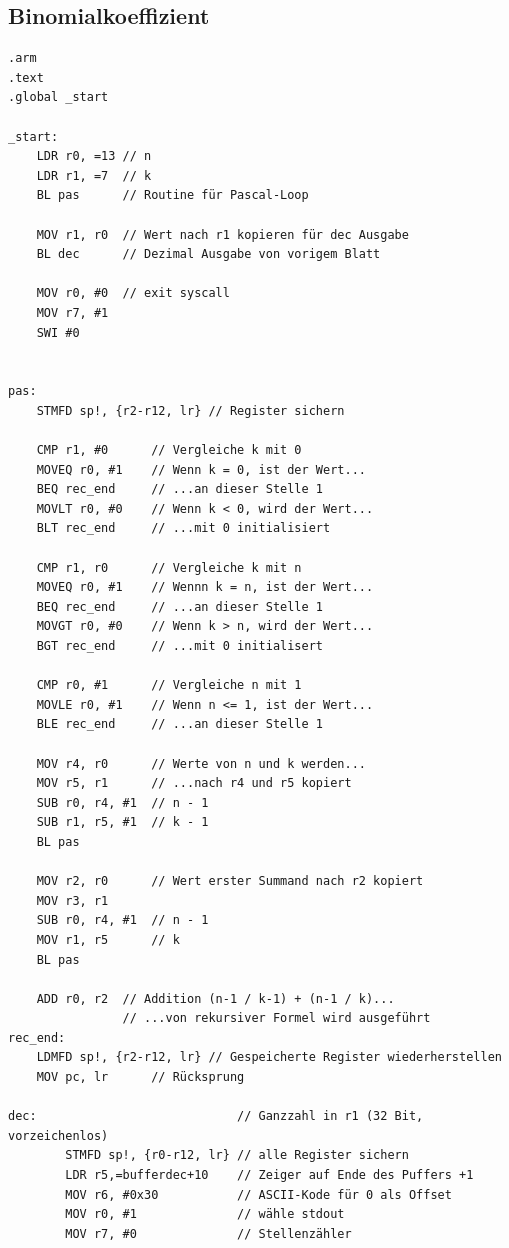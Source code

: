 \documentclass[a4paper, 11pt, onecolumn]{article}
\begin{document}
\subsection{Binomialkoeffizient}\label{app:benchpascal}
\begin{lstlisting}[basicstyle=\ttfamily\footnotesize, language={[ARM]Assembler}, caption={[Benchmark $-$ Programm zur Berechnung des Binomialkoeffizienten]}]
.arm	
.text
.global _start

_start:
	LDR r0, =13 // n
	LDR r1, =7  // k
	BL pas      // Routine für Pascal-Loop
	
	MOV r1, r0  // Wert nach r1 kopieren für dec Ausgabe
	BL dec      // Dezimal Ausgabe von vorigem Blatt

	MOV r0, #0  // exit syscall
	MOV r7, #1
	SWI #0


pas:
	STMFD sp!, {r2-r12, lr} // Register sichern

	CMP r1, #0      // Vergleiche k mit 0
	MOVEQ r0, #1	// Wenn k = 0, ist der Wert... 
	BEQ rec_end     // ...an dieser Stelle 1
	MOVLT r0, #0	// Wenn k < 0, wird der Wert...
	BLT rec_end     // ...mit 0 initialisiert

	CMP r1, r0      // Vergleiche k mit n
	MOVEQ r0, #1	// Wennn k = n, ist der Wert...
	BEQ rec_end     // ...an dieser Stelle 1
	MOVGT r0, #0	// Wenn k > n, wird der Wert...
	BGT rec_end     // ...mit 0 initialisert
	
	CMP r0, #1      // Vergleiche n mit 1
	MOVLE r0, #1	// Wenn n <= 1, ist der Wert...
	BLE rec_end     // ...an dieser Stelle 1
	
	MOV r4, r0      // Werte von n und k werden...
	MOV r5, r1      // ...nach r4 und r5 kopiert
	SUB r0, r4, #1	// n - 1
	SUB r1, r5, #1	// k - 1
	BL pas

	MOV r2, r0      // Wert erster Summand nach r2 kopiert
	MOV r3, r1		
	SUB r0, r4, #1	// n - 1
	MOV r1, r5      // k
	BL pas
	
	ADD r0, r2  // Addition (n-1 / k-1) + (n-1 / k)...
	            // ...von rekursiver Formel wird ausgeführt
rec_end:
	LDMFD sp!, {r2-r12, lr} // Gespeicherte Register wiederherstellen
	MOV pc, lr		// Rücksprung

dec:                            // Ganzzahl in r1 (32 Bit, vorzeichenlos)
        STMFD sp!, {r0-r12, lr} // alle Register sichern
        LDR r5,=bufferdec+10    // Zeiger auf Ende des Puffers +1
        MOV r6, #0x30           // ASCII-Kode für 0 als Offset
        MOV r0, #1              // wähle stdout
        MOV r7, #0              // Stellenzähler
	

\end{lstlisting}
\end{document}
